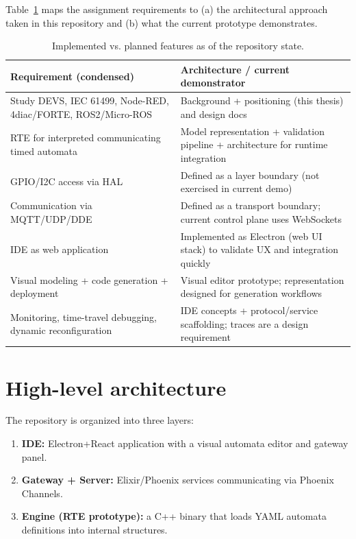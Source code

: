 Table~\ref{tab:status} maps the assignment requirements to (a) the architectural approach taken in this repository and (b) what the current prototype demonstrates.

\begin{table}[h]
\centering
\begin{tabular}{p{}p{}}
\hline
\textbf{Requirement (condensed)} & \textbf{Architecture / current demonstrator}\\
\hline
Study DEVS, IEC 61499, Node-RED, 4diac/FORTE, ROS2/Micro-ROS & Background + positioning (this thesis) and design docs\\
RTE for interpreted communicating timed automata & Model representation + validation pipeline + architecture for runtime integration\\
GPIO/I2C access via HAL & Defined as a layer boundary (not exercised in current demo)\\
Communication via MQTT/UDP/DDE & Defined as a transport boundary; current control plane uses WebSockets\\
IDE as web application & Implemented as Electron (web UI stack) to validate UX and integration quickly\\
Visual modeling + code generation + deployment & Visual editor prototype; representation designed for generation workflows\\
Monitoring, time-travel debugging, dynamic reconfiguration & IDE concepts + protocol/service scaffolding; traces are a design requirement\\
\hline
\end{tabular}
\caption{Implemented vs. planned features as of the repository state.}
\label{tab:status}
\end{table}

\section{High-level architecture}

The repository is organized into three layers:
\begin{enumerate}
  \item \textbf{IDE:} Electron+React application with a visual automata editor and gateway panel.
  \item \textbf{Gateway + Server:} Elixir/Phoenix services communicating via Phoenix Channels.
  \item \textbf{Engine (RTE prototype):} a C++ binary that loads YAML automata definitions into internal structures.
\end{enumerate}

